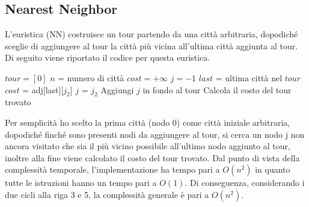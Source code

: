 \documentclass[a4paper,12pt]{report}
\begin{document}
\subsection{Nearest Neighbor}
L'euristica  (NN) costruisce un tour partendo da una città arbitraria, dopodiché sceglie di aggiungere al tour la città più vicina all'ultima città aggiunta al tour. Di seguito viene riportato il codice per questa euristica.
\begin{tcolorbox}[colframe=black, colback=white, boxrule=0.5pt, title=Nearest Neighbor, coltitle=black, fonttitle=\bfseries, colbacktitle=white, breakable]
  \begin{algorithmic}[1]
    \State $tour = [0]$
    \State $n$ = numero di città
        \State $cost = +\infty$
        \State $j = -1$
          \State $last$ = ultima città nel $tour$
            \State $cost$ = adj[last][$j_2$]
            \State $j$ = $j_2$
          \EndIf
        \EndFor
        \State Aggiungi $j$ in fondo al tour
    \EndWhile
    \State Calcola il costo del tour trovato
  \end{algorithmic}
\end{tcolorbox}
Per semplicità ho scelto la prima città (nodo 0) come città iniziale arbitraria, dopodiché finché sono presenti nodi da aggiungere al tour, si cerca un nodo j non ancora visitato che sia il più vicino possibile all'ultimo nodo aggiunto al tour, inoltre alla fine viene calcolato il costo del tour trovato. \newline
Dal punto di vista della complessità temporale, l'implementazione ha tempo pari a $O(n^2)$ in quanto tutte le istruzioni hanno un tempo pari a $O(1)$. Di conseguenza, considerando i due cicli alla riga 3 e 5, la complessità generale è pari a $O(n^2)$.
\end{document}
